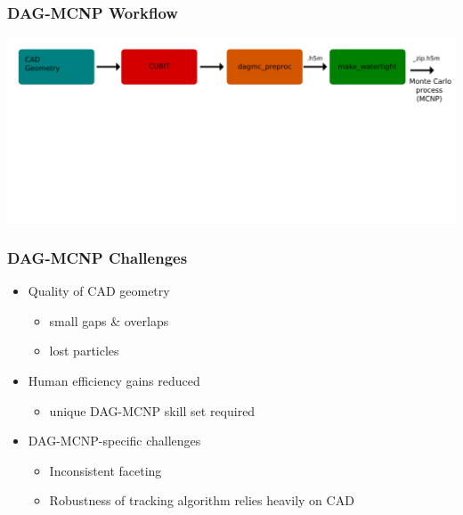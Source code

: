 \documentclass[14pt]{beamer}
\begin{document}
\begin{frame}
\frametitle{DAG-MCNP Workflow}
\includegraphics[scale=0.25, trim = 40 400 0 0]{DAGMC_Wrkflw6.png}
\end{frame}


\begin{frame}
\frametitle{DAG-MCNP Challenges}
\begin{itemize}
\vfill
\item Quality of CAD geometry
	\begin{itemize}
	\item small gaps \& overlaps
	\item lost particles
	\end{itemize}
\vfill
\item Human efficiency gains reduced
	\begin{itemize}
	\item unique DAG-MCNP skill set required
	\end{itemize}
\vfill
\item DAG-MCNP-specific challenges
	\begin{itemize}
	\item Inconsistent faceting
	\item Robustness of tracking algorithm relies heavily on CAD
	\end{itemize}
\end{itemize}
\end{frame}
\end{document}
